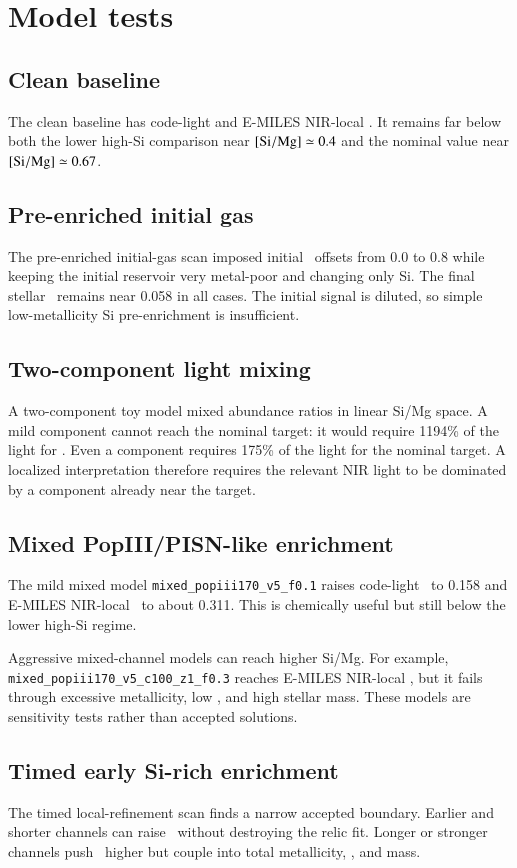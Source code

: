 \section{Model tests}

\subsection{Clean baseline}

The clean baseline has code-light  and E-MILES NIR-local . It remains far below both the lower high-Si comparison near $[\mathrm{Si}/\mathrm{Mg}]\simeq0.4$ and the nominal value near $[\mathrm{Si}/\mathrm{Mg}]\simeq0.67$.

\subsection{Pre-enriched initial gas}

The pre-enriched initial-gas scan imposed initial \simg\ offsets from 0.0 to 0.8 while keeping the initial reservoir very metal-poor and changing only Si. The final stellar \simg\ remains near 0.058 in all cases. The initial signal is diluted, so simple low-metallicity Si pre-enrichment is insufficient.

\subsection{Two-component light mixing}

A two-component toy model mixed abundance ratios in linear Si/Mg space. A mild  component cannot reach the nominal target: it would require 1194\% of the light for . Even a  component requires 175\% of the light for the nominal target. A localized interpretation therefore requires the relevant NIR light to be dominated by a component already near the target.

\subsection{Mixed PopIII/PISN-like enrichment}

The mild mixed model \texttt{mixed\_popiii170\_v5\_f0.1} raises code-light \simg\ to 0.158 and E-MILES NIR-local \simg\ to about 0.311. This is chemically useful but still below the lower high-Si regime.

Aggressive mixed-channel models can reach higher Si/Mg. For example, \texttt{mixed\_popiii170\_v5\_c100\_z1\_f0.3} reaches E-MILES NIR-local , but it fails through excessive metallicity, low \mgfe, and high stellar mass. These models are sensitivity tests rather than accepted solutions.

\subsection{Timed early Si-rich enrichment}

The timed local-refinement scan finds a narrow accepted boundary. Earlier and shorter channels can raise \simg\ without destroying the relic fit. Longer or stronger channels push \simg\ higher but couple into total metallicity, \mgfe, and mass.
